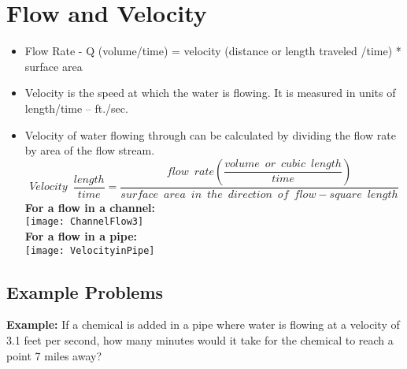 


\section{Flow and Velocity}
\begin{itemize}
\item Flow Rate - Q (volume/time) = velocity (distance or length traveled /time) * surface area
\item Velocity is the speed at which the water is flowing.  It is measured in units of length/time – ft./sec.
\item Velocity of water flowing through can be calculated by dividing the flow rate by area of the flow stream.\\
\vspace{0.5cm}
$$Velocity \enspace \dfrac{length}{time}= \dfrac{flow \enspace rate(\dfrac{volume \enspace or \enspace cubic \enspace length}{time})}{surface \enspace area \enspace in \enspace the \enspace direction \enspace of \enspace flow-square \enspace length}$$
\vspace{0.5cm}
\textbf{For a flow in a channel:}\\
\vspace{0.5cm}
\texttt{[image: ChannelFlow3]}\\

\textbf{For a flow in a pipe:}\\
\vspace{0.5cm}
\texttt{[image: VelocityinPipe]}\\
\vspace{0.5cm}
\end{itemize}
\subsection*{Example Problems}
\textbf{Example:} If a chemical is added in a pipe where water is flowing at a velocity of 3.1 feet per second, how many minutes would it take for the chemical to reach a point 7 miles away?  \\

